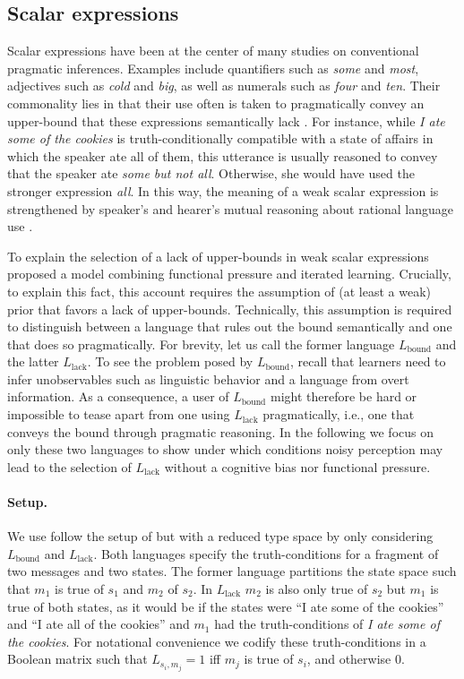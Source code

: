 \documentclass[10pt,a4paper]{article}
\begin{document}
\subsection{Scalar expressions}
Scalar expressions have been at the center of many studies on conventional pragmatic inferences. Examples include quantifiers such as {\em some} and {\em most}, adjectives such as {\em cold} and {\em big}, as well as numerals such as {\em four} and {\em ten}. Their commonality lies in that their use often is taken to pragmatically convey an upper-bound that these expressions semantically lack \citep{horn:1972,gazdar:1979}. For instance, while {\em I ate some of the cookies} is truth-conditionally compatible with a state of affairs in which the speaker ate all of them, this utterance is usually reasoned to convey that the speaker ate {\em some but not all}. Otherwise, she would have used the stronger expression {\em all}. In this way, the meaning of a weak scalar expression is strengthened by speaker's and hearer's mutual reasoning about rational language use \citep{grice:1975}.

To explain the selection of a lack of upper-bounds in weak scalar expressions \citet{brochhagen+etal:2016:CogSci} proposed a model combining functional pressure and iterated learning.  Crucially, to explain this fact, this account requires the assumption of (at least a weak) prior that favors a lack of upper-bounds. Technically, this assumption is required to distinguish between a language that rules out the bound semantically and one that does so pragmatically. For brevity, let us call the former language $L_{\text{bound}}$ and the latter $L_{\text{lack}}$. To see the problem posed by $L_{\text{bound}}$, recall that learners need to infer unobservables such as linguistic behavior and a language from overt information. As a consequence, a user of $L_{\text{bound}}$ might therefore be hard or impossible to tease apart from one using $L_{\text{lack}}$ pragmatically, i.e., one that conveys the bound through pragmatic reasoning. In the following we focus on only these two languages to show under which conditions noisy perception may lead to the selection of $L_{\text{lack}}$ without a cognitive bias nor functional pressure.


\paragraph{Setup.} We use follow the setup of \citet{brochhagen+etal:2016:CogSci} but with a reduced type space by only considering $L_{\text{bound}}$ and $L_{\text{lack}}$. Both languages specify the truth-conditions for a fragment of two messages and two states. The former language partitions the state space such that $m_1$ is true of $s_1$ and $m_2$ of $s_2$. In $L_{\text{lack}}$ $m_2$ is also only true of $s_2$ but $m_1$ is true of both states, as it would be if the states were ``I ate some of the cookies'' and ``I ate all of the cookies'' and $m_1$ had the truth-conditions of {\em I ate some of the cookies}. For notational convenience we codify these truth-conditions in a Boolean matrix such that $L_{s_i,m_j} = 1$ iff $m_j$ is true of $s_i$, and otherwise $0$.
\end{document}
